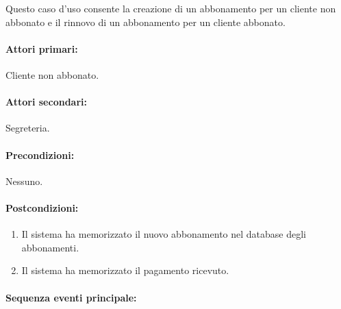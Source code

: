 \documentclass{article}
\begin{document}
	\indent\indent Questo caso d'uso consente la creazione di un abbonamento per un cliente non abbonato e il rinnovo di un abbonamento per un cliente abbonato.

	\paragraph{Attori primari:}Cliente non abbonato.

	\paragraph{Attori secondari:}Segreteria.

	\paragraph{Precondizioni:}Nessuno.

	\paragraph{Postcondizioni:}%
	\begin{enumerate}[itemsep=8pt,parsep=0pt]
		\item Il sistema ha memorizzato il nuovo abbonamento nel database degli abbonamenti.
		\item Il sistema ha memorizzato il pagamento ricevuto.
	\end{enumerate}

	\paragraph{Sequenza eventi principale:}
\end{document}
